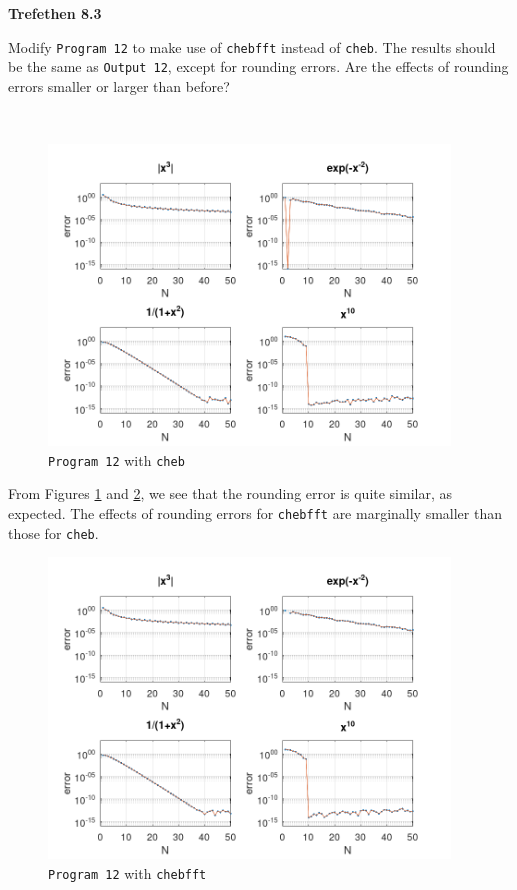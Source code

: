 \textbf{Trefethen 8.3}

Modify \texttt{Program 12} to make use of \texttt{chebfft} instead of \texttt{cheb}. The results should be the same as
\texttt{Output 12}, except for rounding errors. Are the effects of rounding errors smaller or larger than before?

\begin{solution}
  \ \\
  \begin{figure}[h]
    \centering
    \includegraphics[width=0.95\textwidth]{problem_6_cheb.png}
    \caption{\texttt{Program 12} with \texttt{cheb}}
    \label{fig:rounding_with_cheb}
  \end{figure}

  From Figures \ref{fig:rounding_with_cheb} and \ref{fig:rounding_with_chebfft}, we see that the rounding error is quite
  similar, as expected. The effects of rounding errors for \texttt{chebfft} are marginally smaller than those for 
  \texttt{cheb}.

  \pagebreak

  \begin{figure}[h]
    \centering
    \includegraphics[width=0.95\textwidth]{problem_6_chebfft.png}
    \caption{\texttt{Program 12} with \texttt{chebfft}}
    \label{fig:rounding_with_chebfft}
  \end{figure}
  \ \\
\end{solution}